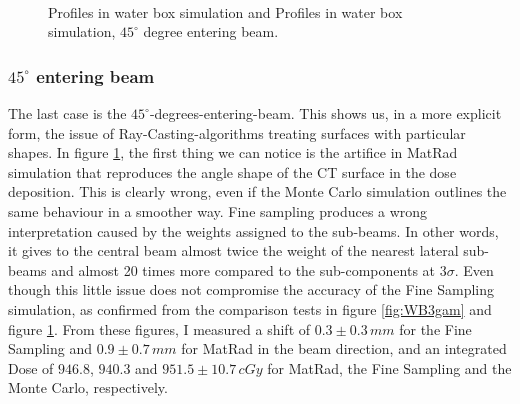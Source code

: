 \documentclass[12pt, a4paper, twoside]{book}
\begin{document}
\begin{figure}[!h]
\centering
{} 
 \\
\caption{Profiles in water box simulation and Profiles in water box simulation,  $45^\circ$ degree entering beam.}
\label{fig:WB3prof}
\end{figure}

\subsubsection{$45^\circ$ entering beam}
The last case is the $45^\circ$-degrees-entering-beam. This shows us, in a more explicit form, the issue of Ray-Casting-algorithms treating surfaces with particular shapes. In figure \ref{fig:WB3prof}, the first thing we can notice is the artifice in MatRad simulation that reproduces the angle shape of the CT surface in the dose deposition. This is clearly wrong, even if the Monte Carlo simulation outlines the same behaviour in a smoother way. Fine sampling produces a wrong interpretation caused by the weights assigned to the sub-beams. In other words, it gives to the central beam almost twice the weight of the nearest lateral sub-beams and almost 20 times more compared to the sub-components at $3\sigma$.
Even though this little issue does not compromise the accuracy of the Fine Sampling simulation, as confirmed from the comparison tests in figure \ref{fig:WB3gam} and figure \ref{fig:WB3prof}. From these figures, I measured a shift of $0.3\pm0.3\,mm$ for the Fine Sampling and $0.9\pm0.7\,mm$ for MatRad in the beam direction, and an integrated Dose of $946.8$, $940.3$ and $951.5\pm10.7\,cGy$ for MatRad, the Fine Sampling and the Monte Carlo, respectively.
\end{document}
